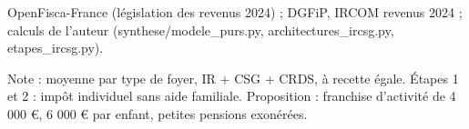OpenFisca-France (législation des revenus 2024) ; DGFiP, IRCOM revenus 2024 ; calculs de l'auteur (synthese/modele\_purs.py, architectures\_ircsg.py, etapes\_ircsg.py).\par Note : moyenne par type de foyer, IR + CSG + CRDS, à recette égale. Étapes 1 et 2 : impôt individuel sans aide familiale. Proposition : franchise d'activité de 4 000 \euro{}, 6 000 \euro{} par enfant, petites pensions exonérées.
